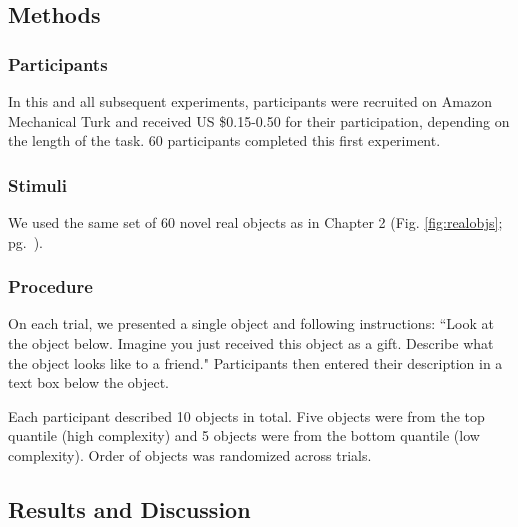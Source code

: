 \subsection{Methods}
\subsubsection{Participants} 
In this and all subsequent experiments, participants were recruited on Amazon Mechanical Turk and received US \$0.15-0.50 for their participation, depending on the length of the task. 60 participants completed this first experiment.
\subsubsection{Stimuli} 
We used the same set of 60 novel real objects as in Chapter 2 (Fig. \ref{fig:realobjs}; pg.\ \pageref{fig:realobjs}).

\subsubsection{Procedure}
On each trial, we presented a single object and following instructions:  ``Look at the object below. Imagine you just received this object as a gift. Describe what the object looks like to a friend." Participants then entered their description in a text box below the object.

Each participant described 10 objects in total. Five objects were from the top quantile (high complexity) and 5 objects were from the bottom quantile (low complexity). Order of objects was randomized across trials.

\subsection{Results and Discussion}


